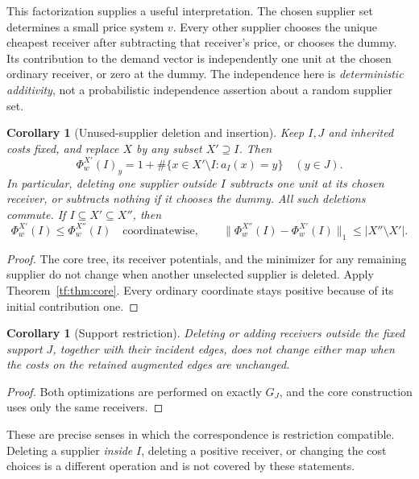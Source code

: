 \documentclass[11pt]{article}
\numberwithin{equation}{section}
\newtheorem{corollary}[theorem]{Corollary}
\theoremstyle{definition}
\begin{document}
This factorization supplies a useful interpretation. The chosen supplier
set determines a small price system $v$. Every other supplier chooses the
unique cheapest receiver after subtracting that receiver's price, or
chooses the dummy. Its contribution to the demand vector is independently
one unit at the chosen ordinary receiver, or zero at the dummy. The
independence here is \emph{deterministic additivity}, not a probabilistic
independence assertion about a random supplier set.

\begin{corollary}[Unused-supplier deletion and insertion]
\label{tf:cor:deletion}
Keep $I,J$ and inherited costs fixed, and replace $X$ by any subset
$X'\supseteq I$. Then
\begin{equation}
 \Phi^{X'}_w(I)_y
 =1+\#\{x\in X'\setminus I:a_I(x)=y\}\quad(y\in J).
 \label{tf:eq:restriction}
\end{equation}
In particular, deleting one supplier outside $I$ subtracts one unit at
its chosen receiver, or subtracts nothing if it chooses the dummy.
All such deletions commute. If $I\subseteq X'\subseteq X''$, then
\begin{equation}
 \Phi^{X'}_w(I)\le\Phi^{X''}_w(I)\quad\text{coordinatewise},\qquad
 \|\Phi^{X''}_w(I)-\Phi^{X'}_w(I)\|_1\le |X''\setminus X'|.
 \label{tf:eq:monotone}
\end{equation}
\end{corollary}
\begin{proof}
The core tree, its receiver potentials, and the minimizer for any
remaining supplier do not change when another unselected supplier is
deleted. Apply Theorem~\ref{tf:thm:core}. Every ordinary coordinate stays
positive because of its initial contribution one.
\end{proof}

\begin{corollary}[Support restriction]
\label{tf:cor:receivers}
Deleting or adding receivers outside the fixed support $J$, together
with their incident edges, does not change either map when the costs on
the retained augmented edges are unchanged.
\end{corollary}
\begin{proof}
Both optimizations are performed on exactly $G_J$, and the core
construction uses only the same receivers.
\end{proof}

These are precise senses in which the correspondence is restriction
compatible. Deleting a supplier \emph{inside} $I$, deleting a positive
receiver, or changing the cost choices is a different operation and is
not covered by these statements.
\end{document}
